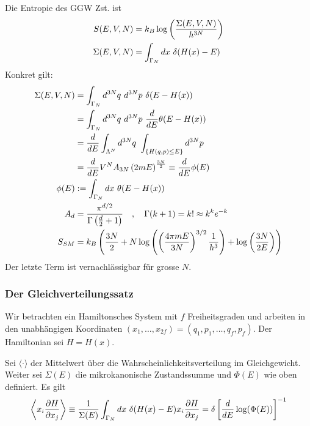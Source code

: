 \begin{beispiel}
    Die Entropie des GGW Zst. ist
    \begin{align*}
        S(E,V,N) &= k_B \log \left( \frac{\Sigma(E,V,N)}{h^{3N}} \right)
        \\
        \Sigma(E,V,N) &= \int_{\Gamma_N} dx \ \delta(H(x) - E)
    \end{align*}
    Konkret gilt:
    \begin{align*}
        \Sigma(E,V,N) &=
        \int_{\Gamma_N} d^{3N} q \ d^{3N} p \ \delta (E - H(x))
        \\
        &= \int_{\Gamma_N} d^{3N} q \ d^{3N} p \ \frac{d}{dE} \theta(E - H(x))
        \\
        &= \frac{d}{dE} \int_{\Lambda^N} d^{3N} q \ \int_{\geschwungeneklammer{H(q,p) \leq E}} d^{3N} p
        \\
        &= \frac{d}{dE} V^N A_{3N} \klammer{2 m E}^{\frac{3 N}{2}}
        \equiv \frac{d}{dE} \phi(E)
        \\
        \phi(E) &:= \int_{\Gamma_N} dx \ \theta(E - H(x)) 
        \\
        A_d &= \frac{\pi^{d/2}}{\Gamma \klammer{\frac{d}{2} + 1}}
        \hspace{10pt} , \hspace{10pt} \Gamma(k+1) = k! \approx k^k e^{-k}
        \\
        S_{SM} &= k_B \klammer{\frac{3N}{2} + N \log \klammer{\klammer{\frac{4 \pi m E}{3 N}}^{3/2} \frac{1}{h^3}} + \log \klammer{\frac{3N}{2E}}}
    \end{align*}
Der letzte Term ist vernachlässigbar für grosse $N$.
\end{beispiel}

\subsubsection{Der Gleichverteilungssatz}

Wir betrachten ein Hamiltonsches System mit $f$ Freiheitsgraden und
arbeiten in den unabhängigen Koordinaten $(x_1,\dots,x_{2f}) =
(q_1,p_1,\dots,q_f,p_f)$. Der Hamiltonian sei $H = H(x)$.

\begin{theorem}[Gleichverteilungssatz]
    Sei $\langle \cdot \rangle$ der Mittelwert über die Wahrscheinlichkeitsverteilung
    im Gleichgewicht. Weiter sei $\Sigma(E)$ die mikrokanonische Zustandssumme
    und $\Phi(E)$ wie oben definiert. Es gilt
    \begin{align*}
        \left\langle x_i \frac{\partial H}{\partial x_j} \right\rangle
        \equiv \frac{1}{\Sigma(E)} \int_{\Gamma_N} dx \ \delta(H(x) - E) x_i \frac{\partial H}{\partial x_j}
        = \delta \left[ \frac{d}{dE} \log(\Phi(E)) \right]^{-1}
    \end{align*}
\end{theorem}

